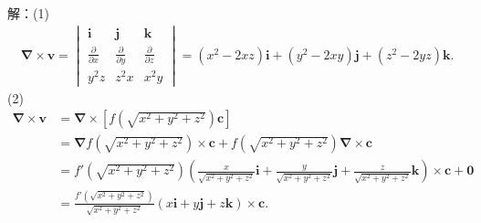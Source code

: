 \documentclass[12pt,UTF8,fleqn]{ctexart}
\newcommand{\pp}[2]{\frac{\partial #1}{\partial #2}}
\begin{document}
\begin{enumerate}
解：(1)\[\begin{split}
\bm\nabla\times\bm v=\begin{vmatrix}
\bm i&\bm j&\bm k\\
\pp{}x&\pp{}y&\pp{}z\\
y^2z&z^2x&x^2y
\end{vmatrix}=(x^2-2xz)\bm i+(y^2-2xy)\bm j+(z^2-2yz)\bm k.
\end{split}\]
(2)\[\begin{split}
\bm\nabla\times\bm v&=\bm\nabla\times[f(\sqrt{x^2+y^2+z^2})\bm c]\\
&=\bm\nabla f(\sqrt{x^2+y^2+z^2})\times\bm c+f(\sqrt{x^2+y^2+z^2})\bm\nabla\times\bm c\\
&=f'(\sqrt{x^2+y^2+z^2})(\frac x{\sqrt{x^2+y^2+z^2}}\bm i+\frac y{\sqrt{x^2+y^2+z^2}}\bm j+\frac z{\sqrt{x^2+y^2+z^2}}\bm k)\times\bm c+\bm0\\
&=\frac{f'(\sqrt{x^2+y^2+z^2})}{\sqrt{x^2+y^2+z^2}}(x\bm i+y\bm j+z\bm k)\times\bm c.
\end{split}\]
\end{enumerate}
\end{document}

